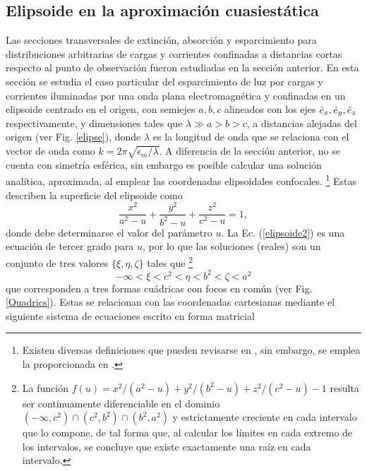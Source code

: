 \hypertarget{elipsoide}{\subsection{Elipsoide en la aproximación cuasiestática}}
Las secciones transversales de extinción, absorción y esparcimiento para distribuciones arbitrarias de cargas y corrientes confinadas a distancias cortas respecto al punto de observación fueron estudiadas en la sección anterior. En esta sección se estudia el caso particular del esparcimiento de luz por cargas y corrientes iluminadas por una onda plana electromagnética y confinadas en un elipsoide centrado en el origen, con semiejes $a,b,c$ alineados con los ejes $\hat{e}_{x},\hat{e}_{y},\hat{e}_{z}$ respectivamente, y dimensiones tales que $\lambda\gg a>b>c$, a distancias alejadas del origen (ver Fig. \ref{elipse}), donde $\lambda$ es la longitud de onda que se relaciona con el vector de onda como $k=2\pi\sqrt{\epsilon_m/\lambda}$. A diferencia de la sección anterior, no se cuenta con simetría esférica, sin embargo es posible calcular una solución analítica, aproximada, al emplear las coordenadas elipsoidales confocales. \footnote{Existen diversas definiciones que pueden revisarse en \cite{ConfocalEllip}, sin embargo, se emplea la proporcionada en \cite{Arfken}. } Estas describen la superficie del elipsoide como \cite{ConfocalEllip}
\begin{equation}
	\frac{x^2}{a^2-u}+\frac{y^2}{b^2-u}+\frac{z^2}{c^2-u}=1,
	\label{elipsoide2}
\end{equation}
 donde debe determinarse el valor del parámetro $u$. La Ec. (\ref{elipsoide2}) es una ecuación de tercer grado para $u$, por lo que las soluciones (reales) son un conjunto de tres valores $\{\xi,\eta,\zeta\}$ tales que \footnote{La función $f(u)=x^2/(a^2-u)+y^2/(b^2-u)+z^2/(c^2-u)-1$ resulta ser continuamente diferenciable en el dominio $(-\infty, c^2)\cap (c^2, b^2)\cap (b^2, a^2)$ y estrictamente creciente en cada intervalo que lo compone, de tal forma que, al calcular los límites en cada extremo de los intervalos, se concluye que existe exactamente una raíz en cada intervalo.}
\begin{equation}
	-\infty<\xi<c^2<\eta<b^2<\zeta<a^2
\end{equation}
que corresponden a tres formas cuádricas con focos en común (ver Fig. \ref{Quadrics}). Estas se relacionan con las coordenadas cartesianas mediante el siguiente sistema de ecuaciones escrito en forma matricial
